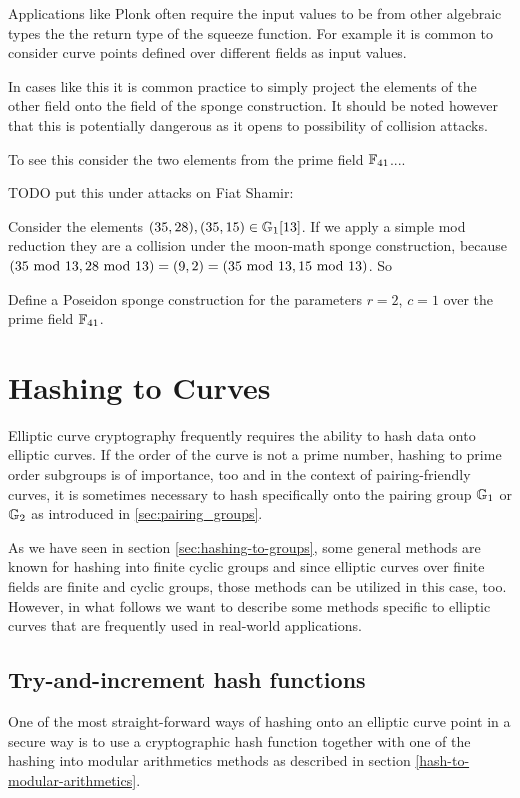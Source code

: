 Applications like Plonk often require the input values to be from other algebraic types the the return type of the squeeze function. For example it is common to consider curve points defined over different fields as input values. 

In cases like this it is common practice to simply project the elements of the other field onto the field of the sponge construction. It should be noted however that this is potentially dangerous as it opens to possibility of collision attacks. 

To see this consider the two elements from the prime field $\mathbb{F}_{41}$....

TODO put this under attacks on Fiat Shamir:

Consider the elements $(35, 28) , (35, 15) \in \mathbb{G}_1[13]$. If we apply a simple mod reduction they are a collision under the moon-math sponge construction, because 
$(35 \text{ mod } 13, 28 \text{ mod } 13) = (9,2) = (35 \text{ mod } 13, 15 \text{ mod } 13)$. So
 




   

\begin{exercise}
Define a Poseidon sponge construction for the parameters $r=2$, $c=1$ over the prime field $\mathbb{F}_{41}$.
\end{exercise}


\section{Hashing to Curves} Elliptic curve cryptography frequently requires the ability to hash data onto elliptic curves. If the order of the curve is not a prime number, hashing to prime order subgroups is of importance, too and in the context of pairing-friendly curves, it is sometimes necessary to hash specifically onto the pairing group $\mathbb{G}_1$ or $\mathbb{G}_2$ as introduced in \ref{sec:pairing_groups}.

As we have seen in section \ref{sec:hashing-to-groups}, some general methods are known for hashing into finite cyclic groups and since elliptic curves over finite fields are finite and cyclic groups, those methods can be utilized in this case, too. However, in what follows we want to describe some methods specific to elliptic curves that are frequently used in real-world applications. 

\subsection{Try-and-increment hash functions}
One of the most straight-forward ways of hashing onto an elliptic curve point in a secure way is to use a cryptographic hash function together with one of the hashing into modular arithmetics methods as described in section \ref{hash-to-modular-arithmetics}.

